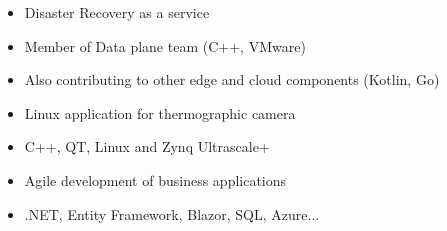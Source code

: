 





\begin{itemize}
\item Disaster Recovery as a service
\item Member of Data plane team (C++, VMware)
\item Also contributing to other edge and cloud components (Kotlin, Go)
\end{itemize}

\vspace{10px}


\begin{itemize}
\item Linux application for thermographic camera
\item C++, QT, Linux and Zynq Ultrascale+
\end{itemize}

\vspace{8px}


\begin{itemize}
\item Agile development of business applications 
\item .NET, Entity Framework, Blazor, SQL, Azure...
\end{itemize}

\vspace{10px}

